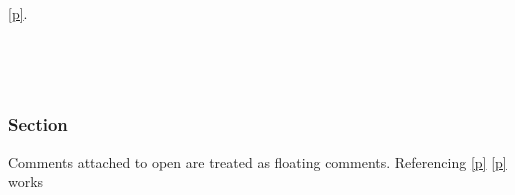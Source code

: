 \medbreak
\label{module-Toplevel+u+comments-module-Ref+u+in+u+synopsis}\begin{ocamlindent}\label{module-Toplevel+u+comments-module-Ref+u+in+u+synopsis-type-t}\\
\end{ocamlindent}%
\begin{ocamlindent}\hyperref[module-Toplevel+u+comments-module-Ref+u+in+u+synopsis-type-t]{[p\pageref*{module-Toplevel+u+comments-module-Ref+u+in+u+synopsis-type-t}]}.\end{ocamlindent}%
\medbreak
\label{module-Toplevel+u+comments-module-Comments+u+on+u+open}\begin{ocamlindent}\label{module-Toplevel+u+comments-module-Comments+u+on+u+open-module-M}\begin{ocamlindent}\label{module-Toplevel+u+comments-module-Comments+u+on+u+open-module-M-type-t}\\
\end{ocamlindent}%
\\
\subsubsection{Section\label{sec}}%
Comments attached to open are treated as floating comments. Referencing \hyperref[module-Toplevel+u+comments-module-Comments+u+on+u+open-sec]{[p\pageref*{module-Toplevel+u+comments-module-Comments+u+on+u+open-sec}]} \hyperref[module-Toplevel+u+comments-module-Comments+u+on+u+open-module-M-type-t]{[p\pageref*{module-Toplevel+u+comments-module-Comments+u+on+u+open-module-M-type-t}]} works

\end{ocamlindent}%
\\





